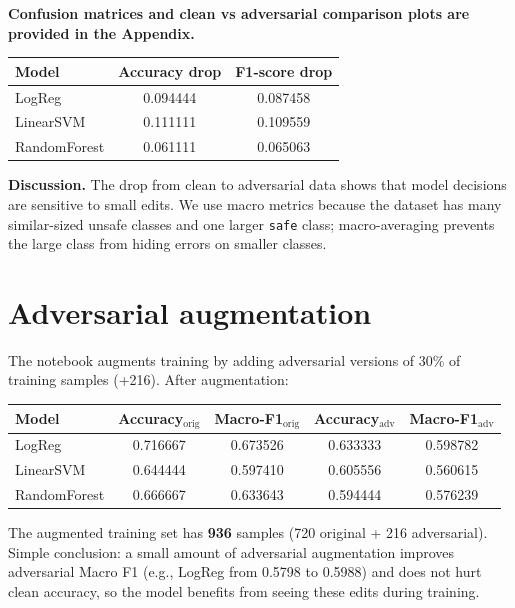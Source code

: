 \documentclass[11pt,a4paper]{article}
\begin{document}
\noindent\textbf{Confusion matrices and clean vs adversarial comparison plots are provided in the Appendix.}

\begin{center}
\begin{tabular}{lcc}
\toprule
Model & Accuracy drop & F1-score drop \\
\midrule
LogReg        & 0.094444 & 0.087458 \\
LinearSVM    & 0.111111 & 0.109559  \\
RandomForest & 0.061111 & 0.065063   \\
\bottomrule
\end{tabular}
\end{center}

\noindent\textbf{Discussion.} The drop from clean to adversarial data shows that model decisions are sensitive to small edits. We use macro metrics because the dataset has many similar-sized unsafe classes and one larger \texttt{safe} class; macro-averaging prevents the large class from hiding errors on smaller classes.

\section{Adversarial augmentation}
The notebook augments training by adding adversarial versions of 30\% of training samples (+216). After augmentation:

\begin{center}
\begin{tabular}{lcccc}
\toprule
Model & Accuracy$_{\text{orig}}$ & Macro-F1$_{\text{orig}}$ & Accuracy$_{\text{adv}}$ & Macro-F1$_{\text{adv}}$ \\
\midrule
LogReg       & 0.716667 & 0.673526 & 0.633333 & 0.598782 \\
LinearSVM    & 0.644444 & 0.597410 & 0.605556 & 0.560615 \\
RandomForest & 0.666667 & 0.633643 & 0.594444 & 0.576239 \\
\bottomrule
\end{tabular}
\end{center}

The augmented training set has \textbf{936} samples (720 original + 216 adversarial).
Simple conclusion: a small amount of adversarial augmentation improves adversarial Macro F1 (e.g., LogReg from 0.5798 to 0.5988) and does not hurt clean accuracy, so the model benefits from seeing these edits during training.
\end{document}
